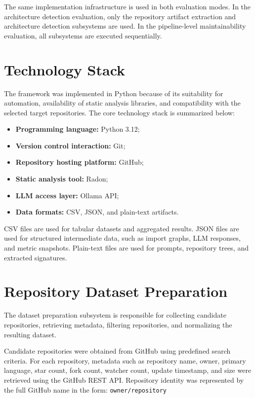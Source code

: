 The same implementation infrastructure is used in both evaluation modes. In the architecture detection evaluation, only the repository artifact extraction and architecture detection subsystems are used. In the pipeline-level maintainability evaluation, all subsystems are executed sequentially.

\section{Technology Stack}

The framework was implemented in Python because of its suitability for automation, availability of static analysis libraries, and compatibility with the selected target repositories. The core technology stack is summarized below:

\begin{itemize}
    \item \textbf{Programming language:} Python 3.12;
    \item \textbf{Version control interaction:} Git;
    \item \textbf{Repository hosting platform:} GitHub;
    \item \textbf{Static analysis tool:} Radon;
    \item \textbf{LLM access layer:} Ollama API;
    \item \textbf{Data formats:} CSV, JSON, and plain-text artifacts.
\end{itemize}

CSV files are used for tabular datasets and aggregated results. JSON files are used for structured intermediate data, such as import graphs, LLM responses, and metric snapshots. Plain-text files are used for prompts, repository trees, and extracted signatures.

\section{Repository Dataset Preparation}

The dataset preparation subsystem is responsible for collecting candidate repositories, retrieving metadata, filtering repositories, and normalizing the resulting dataset.

Candidate repositories were obtained from GitHub using predefined search criteria. For each repository, metadata such as repository name, owner, primary language, star count, fork count, watcher count, update timestamp, and size were retrieved using the GitHub REST API. Repository identity was represented by the full GitHub name in the form: \verb|owner/repository|

